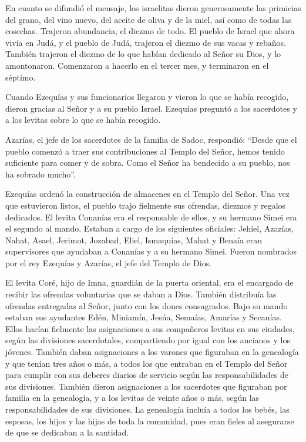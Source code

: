  En cuanto se difundió el mensaje, los israelitas dieron
generosamente las primicias del grano, del vino nuevo, del aceite de
oliva y de la miel, así como de todas las cosechas. Trajeron abundancia,
el diezmo de todo.  El pueblo de Israel que ahora vivía en
Judá, y el pueblo de Judá, trajeron el diezmo de sus vacas y rebaños.
También trajeron el diezmo de lo que habían dedicado al Señor su Dios, y
lo amontonaron.  Comenzaron a hacerlo en el tercer mes, y
terminaron en el séptimo.

 Cuando Ezequías y sus funcionarios llegaron y vieron lo que
se había recogido, dieron gracias al Señor y a su pueblo Israel.
 Ezequías preguntó a los sacerdotes y a los levitas sobre lo
que se había recogido.

 Azarías, el jefe de los sacerdotes de la familia de Sadoc,
respondió: ``Desde que el pueblo comenzó a traer sus contribuciones al
Templo del Señor, hemos tenido suficiente para comer y de sobra. Como el
Señor ha bendecido a su pueblo, nos ha sobrado mucho''.

 Ezequías ordenó la construcción de almacenes en el Templo
del Señor. Una vez que estuvieron listos,  el pueblo trajo
fielmente sus ofrendas, diezmos y regalos dedicados. El levita Conanías
era el responsable de ellos, y su hermano Simei era el segundo al mando.
 Estaban a cargo de los siguientes oficiales: Jehiel,
Azazías, Nahat, Asael, Jerimot, Jozabad, Eliel, Ismaquías, Mahat y
Benaía eran supervisores que ayudaban a Conanías y a su hermano Simei.
Fueron nombrados por el rey Ezequías y Azarías, el jefe del Templo de
Dios.

 El levita Coré, hijo de Imna, guardián de la puerta
oriental, era el encargado de recibir las ofrendas voluntarias que se
daban a Dios. También distribuía las ofrendas entregadas al Señor, junto
con los dones consagrados.  Bajo su mando estaban sus
ayudantes Edén, Miniamín, Jesúa, Semaías, Amarías y Secanías. Ellos
hacían fielmente las asignaciones a sus compañeros levitas en sus
ciudades, según las divisiones sacerdotales, compartiendo por igual con
los ancianos y los jóvenes.  También daban asignaciones a
los varones que figuraban en la genealogía y que tenían tres años o más,
a todos los que entraban en el Templo del Señor para cumplir con sus
deberes diarios de servicio según las responsabilidades de sus
divisiones.  También dieron asignaciones a los sacerdotes
que figuraban por familia en la genealogía, y a los levitas de veinte
años o más, según las responsabilidades de sus divisiones. 
La genealogía incluía a todos los bebés, las esposas, los hijos y las
hijas de toda la comunidad, pues eran fieles al asegurarse de que se
dedicaban a la santidad.


